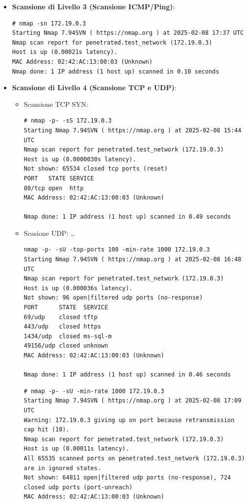 \documentclass[12pt]{article}
\begin{document}
\begin{itemize}
    \item \textbf{Scansione di Livello 3 (Scansione ICMP/Ping)}:
    \begin{lstlisting}[label=shell, basicstyle=\tiny]
# nmap -sn 172.19.0.3 
Starting Nmap 7.94SVN ( https://nmap.org ) at 2025-02-08 17:37 UTC
Nmap scan report for penetrated.test_network (172.19.0.3)
Host is up (0.00021s latency).
MAC Address: 02:42:AC:13:00:03 (Unknown)
Nmap done: 1 IP address (1 host up) scanned in 0.10 seconds
    \end{lstlisting}
    \item \textbf{Scansione di Livello 4 (Scansione TCP e UDP)}:
    \begin{itemize}
        \item Scansione TCP SYN:
        \begin{lstlisting}[label=shell, basicstyle=\tiny]
# nmap -p- -sS 172.19.0.3
Starting Nmap 7.94SVN ( https://nmap.org ) at 2025-02-08 15:44 UTC
Nmap scan report for penetrated.test_network (172.19.0.3)
Host is up (0.0000030s latency).
Not shown: 65534 closed tcp ports (reset)
PORT   STATE SERVICE
80/tcp open  http
MAC Address: 02:42:AC:13:00:03 (Unknown)

Nmap done: 1 IP address (1 host up) scanned in 0.49 seconds
        \end{lstlisting}
        \item Scasione UDP: \dots
        \begin{lstlisting}[label=shell, basicstyle=\tiny]
nmap -p- -sU -top-ports 100 -min-rate 1000 172.19.0.3
Starting Nmap 7.94SVN ( https://nmap.org ) at 2025-02-08 16:48 UTC
Nmap scan report for penetrated.test_network (172.19.0.3)
Host is up (0.000036s latency).
Not shown: 96 open|filtered udp ports (no-response)
PORT      STATE  SERVICE
69/udp    closed tftp
443/udp   closed https
1434/udp  closed ms-sql-m
49156/udp closed unknown
MAC Address: 02:42:AC:13:00:03 (Unknown)

Nmap done: 1 IP address (1 host up) scanned in 0.46 seconds
        \end{lstlisting}
        \begin{lstlisting}[label=shell, basicstyle=\tiny]
# nmap -p- -sU -min-rate 1000 172.19.0.3
Starting Nmap 7.94SVN ( https://nmap.org ) at 2025-02-08 17:09 UTC
Warning: 172.19.0.3 giving up on port because retransmission cap hit (10).
Nmap scan report for penetrated.test_network (172.19.0.3)
Host is up (0.00011s latency).
All 65535 scanned ports on penetrated.test_network (172.19.0.3) are in ignored states.
Not shown: 64811 open|filtered udp ports (no-response), 724 closed udp ports (port-unreach)
MAC Address: 02:42:AC:13:00:03 (Unknown)


\end{lstlisting}
\end{itemize}
\end{itemize}
\end{document}
